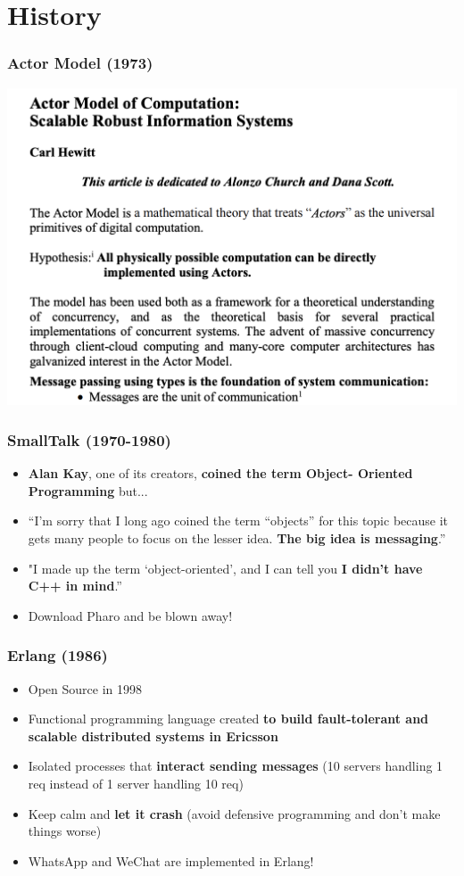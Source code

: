 \documentclass{beamer}
\begin{document}
\section{History}

\begin{frame}
\frametitle{Actor Model (1973)}
\includegraphics[scale=0.5]{images/actor_model_paper.png}
\end{frame}

\begin{frame}
\frametitle{SmallTalk (1970-1980)}
   \begin{itemize}
    \item<1->  \textbf{Alan Kay}, one of its creators, \textbf{coined the term Object- Oriented Programming }but...   
    \item<2->  “I’m sorry that I long ago coined the term “objects” for this topic because it gets many people to focus on the lesser idea. \textbf{The big idea is messaging}.”
    \item<3-> "I made up the term ‘object-oriented’, and I can tell you \textbf{I didn’t have C++ in mind}.”
     \item<4-> Download Pharo and be blown away!
   \end{itemize}      
\end{frame}

\begin{frame}
\frametitle{Erlang (1986)}
   \begin{itemize}
    \item<1->  Open Source in 1998      
    \item<2->  Functional programming language created \textbf{to build fault-tolerant and scalable distributed systems in Ericsson}
    \item<3->  Isolated processes that \textbf{interact sending messages} (10 servers handling 1 req instead of 1 server handling 10 req)
    \item<4->  Keep calm and \textbf{let it crash} (avoid defensive programming and don't make things worse)
    \item<5-> WhatsApp  and WeChat are implemented in Erlang!
  \end{itemize}      
\begin{figure}
\end{figure}
\end{frame} 
\end{document}
